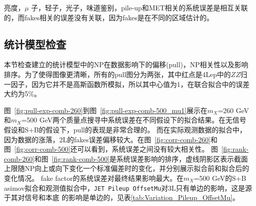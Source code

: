 亮度，$\mu$ 子，轻子，光子，味道鉴别，pile-up和MET相关的系统误差是相互关联的，而fakes相关的误差没有关联，因为fakes是在不同的区域估计的。

\subsection{统计模型检查}
本节检查建立的统计模型中的NP在数据影响下的偏移(pull)，NP相关性以及影响排序。为了使得图像更清晰，所有的pull图分为两张，其中红点是4Lep中的$ZZ$归一因子，因为它并不是高斯函数所模拟，所以其中心值为1，在联合拟合中的误差大约为5\%。

图~\ref{fig:pull-exp-comb-260}到图~\ref{fig:pull-exp-comb-500_mu1}展示在$m_X$=260 GeV和$m_X$=500 GeV两个质量点搜寻中系统误差在不同假设下的拟合结果。在无信号假设和S+B的假设下，pull的表现是非常合理的。
而在实际观测数据的拟合中，因为数据的涨落，2L的fakes误差偏移较大。在图~\ref{fig:corr-comb-260}和图~\ref{fig:corr-comb-500}还可以看到，系统误差之间没有较大相关性。
图~\ref{fig:rank-comb-260}和图~\ref{fig:rank-comb-500}是系统误差影响的排序，虚线阴影区表示截面上限随NP向上或向下变化一个标准偏差时的变化，并分别展示拟合前和拟合后的变化情况。
fake factor的系统误差对最终结果影响最大。在$m_X$=500 GeV的S+B asimov拟合和观测值拟合中，\texttt{JET Pileup OffsetMu}对3L只有单边的影响，这是源于其对信号和本底
的影响是单边的，见表\ref{tab:Variation_Pileup_OffsetMu}。
\begin{table}
\scriptsize{}
\caption{系统误差\texttt{JET\_Pileup\_OffsetMu}对信号本底的相对影响，其正反变化不对称。}
\label{tab:Variation_Pileup_OffsetMu}
\end{table}


